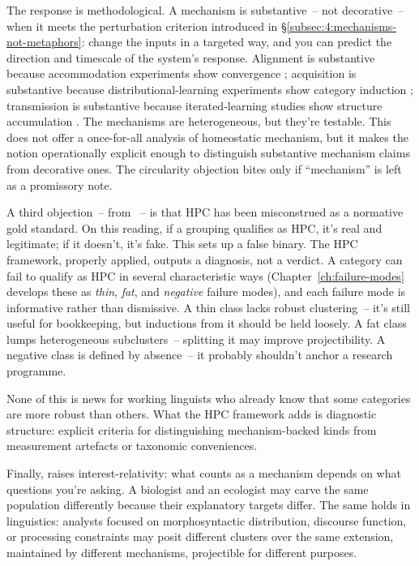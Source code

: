The response is methodological. A mechanism is substantive~-- not decorative~-- when it meets the perturbation criterion introduced in §\ref{subsec:4:mechanisms-not-metaphors}: change the inputs in a targeted way, and you can predict the direction and timescale of the system's response. Alignment is substantive because accommodation experiments show convergence \citep{pickering2004}; acquisition is substantive because distributional-learning experiments show category induction \citep{mintz2003}; transmission is substantive because iterated-learning studies show structure accumulation \citep{kirby2008}. The mechanisms are heterogeneous, but they're testable. This does not offer a once-for-all analysis of homeostatic mechanism, but it makes the notion operationally explicit enough to distinguish substantive mechanism claims from decorative ones. The circularity objection bites only if \enquote{mechanism} is left as a promissory note.

A third objection~-- from \textcite{lipski2020}~-- is that HPC has been misconstrued as a normative gold standard. On this reading, if a grouping qualifies as HPC, it's real and legitimate; if it doesn't, it's fake. This sets up a false binary. The HPC framework, properly applied, outputs a diagnosis, not a verdict. A category can fail to qualify as HPC in several characteristic ways (Chapter~\ref{ch:failure-modes} develops these as \emph{thin}, \emph{fat}, and \emph{negative} failure modes), and each failure mode is informative rather than dismissive. A thin class lacks robust clustering~-- it's still useful for bookkeeping, but inductions from it should be held loosely. A fat class lumps heterogeneous subclusters~-- splitting it may improve projectibility. A negative class is defined by absence~-- it probably shouldn't anchor a research programme.

None of this is news for working linguists who already know that some categories are more robust than others. What the HPC framework adds is diagnostic structure: explicit criteria for distinguishing mechanism-backed kinds from measurement artefacts or taxonomic conveniences.

Finally, \textcite{craver2009} raises interest-relativity: what counts as a mechanism depends on what questions you're asking. A biologist and an ecologist may carve the same population differently because their explanatory targets differ. The same holds in linguistics: analysts focused on morphosyntactic distribution, discourse function, or processing constraints may posit different clusters over the same extension, maintained by different mechanisms, projectible for different purposes.

